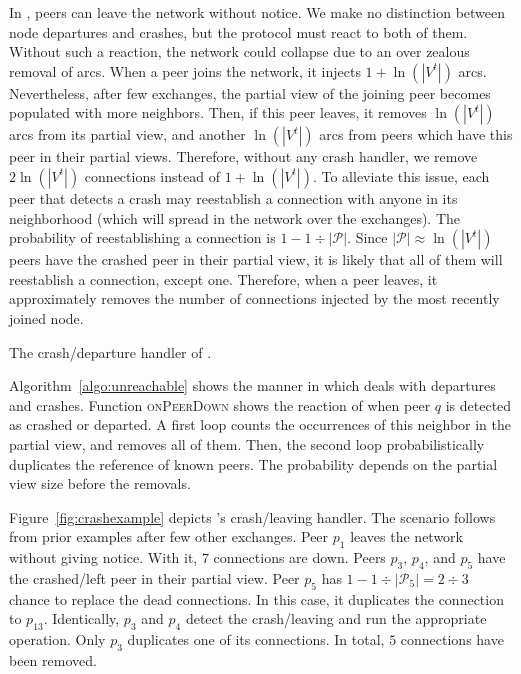 In \SPRAY, peers can leave the network without notice. We make no
distinction between node departures and crashes, but the protocol must
react to both of them. Without such a reaction, the network could
collapse due to an over zealous removal of arcs. When a peer joins the
network, it injects $1+\ln(|V^t|)$ arcs. Nevertheless, after few
exchanges, the partial view of the joining peer becomes populated with
more neighbors. Then, if this peer leaves, it removes $\ln(|V^t|)$
arcs from its partial view, and another $\ln(|V^t|)$ arcs from peers
which have this peer in their partial views. Therefore, without any
crash handler, we remove $2\ln(|V^t|)$ connections instead of
$1+\ln(|V^t|)$. To alleviate this issue, each peer that detects a
crash may reestablish a connection with anyone in its neighborhood
(which will spread in the network over the exchanges). The probability
of reestablishing a connection is $1-{1\div{|\mathcal{P}|}}$. Since
${|\mathcal{P}|}\approx \ln(|V^t|)$ peers have the crashed peer in
their partial view, it is likely that all of them will reestablish a
connection, except one. Therefore, when a peer leaves, it
approximately removes the number of connections injected by the most
recently joined node.

\begin{algorithm}[h]
  
  \caption{\label{algo:unreachable}The crash/departure handler of \SPRAY.}
\end{algorithm}

Algorithm~\ref{algo:unreachable} shows the manner in which \SPRAY deals with
departures and crashes.  Function \textsc{onPeerDown} shows the reaction of \SPRAY
when peer $q$ is detected as crashed or departed. A first loop counts the
occurrences of this neighbor in the partial view, and removes all of
them. Then, the second loop probabilistically duplicates the reference of 
known peers. The probability depends on the partial view size before the
removals.

Figure~\ref{fig:crashexample} depicts \SPRAY's crash/leaving handler. The
scenario follows from prior examples after few other exchanges. Peer $p_1$
leaves the network without giving notice. With it, $7$ connections are
down. Peers $p_3$, $p_4$, and $p_5$ have the crashed/left peer in their partial
view. Peer $p_5$ has $1-{1\div{|\mathcal{P}_5|}}={2\div{3}}$ chance to replace
the dead connections. In this case, it duplicates the connection to
$p_{13}$. Identically, $p_3$ and $p_4$ detect the crash/leaving and run the
appropriate operation. Only $p_3$ duplicates one of its connections. In total,
$5$ connections have been removed.


